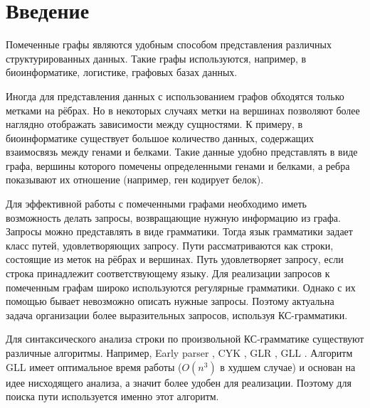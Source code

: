 \documentclass[14pt]{matmex-diploma}
\begin{document}
\maketitle
\tableofcontents
\section*{Введение}

Помеченные графы являются удобным способом представления различных структурированных данных. Такие графы используются, например, в биоинформатике, логистике, графовых базах данных.

  Иногда для представления данных с использованием графов обходятся только метками на рёбрах. Но в некоторых случаях метки на вершинах позволяют более наглядно отображать зависимости между сущностями. К примеру, в биоинформатике существует большое количество данных, содержащих взаимосвязь между генами и белками. Такие данные удобно представлять в виде графа, вершины которого помечены определенными генами и белками, а ребра показывают их отношение (например, ген кодирует белок).

  Для эффективной работы с помеченными графами необходимо иметь возможность делать запросы, возвращающие нужную информацию из графа. Запросы можно представлять в виде грамматики. Тогда язык грамматики задает класс путей, удовлетворяющих запросу. Пути рассматриваются как строки, состоящие из меток на рёбрах и вершинах. Путь удовлетворяет запросу, если строка принадлежит соответствующему языку. Для реализации запросов к помеченным графам широко используются регулярные грамматики. Однако с их помощью бывает невозможно описать нужные запросы. Поэтому актуальна задача организации более выразительных запросов, используя КС-грамматики.

  Для синтаксического анализа строки по произвольной КС-грамматике существуют различные алгоритмы. Например, Early parser \cite{Early} , CYK \cite{CYK}, GLR \cite{glr}, GLL \cite{gll}. Алгоритм GLL имеет оптимальное время работы ($O(n^3)$ в худшем случае) и основан на идее нисходящего анализа, а значит более удобен для реализации. Поэтому для поиска пути используется именно этот алгоритм.
\end{document}
